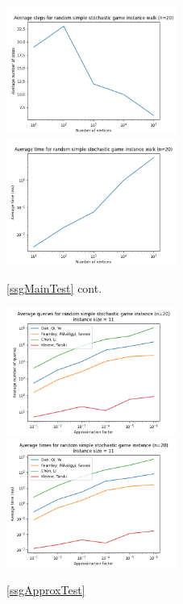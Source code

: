   \begin{figure}[H]
      \centering
      \includegraphics[width=2.2in]{plots/simple_steps.png}
      \centering
      \includegraphics[width=2.2in]{plots/simple_wtime.png}
      \caption{\cref{ssgMainTest} cont.} \label{simpleWalkPlot}
  \end{figure}
  \begin{figure}[H]
      \centering
      \includegraphics[width=2.2in]{plots/simple_eps_queries.png}
      \centering
      \includegraphics[width=2.2in]{plots/simple_eps_times.png}
      \caption{\cref{ssgApproxTest}} \label{simpleApproxPlot}
  \end{figure}
